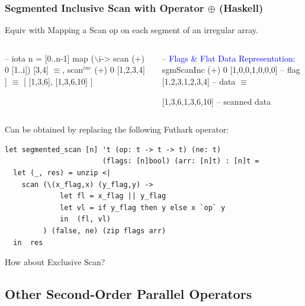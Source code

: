 \documentclass{beamer}
\newcommand{\blue}[1]{\textcolor{Blue}{{#1}}}
\renewcommand{\emph}[1]{\textcolor{structure}{#1}}
\newcommand{\emp}[1]{\textcolor{DikuRed}{ #1}}
\newcommand{\emphh}[1]{\textcolor{CosGreen}{ #1}}
\newcommand{\mymath}[1]{$ #1 $}
\newcommand{\myindu}[1]{^{#1}}
\begin{document}
\begin{frame}[fragile,t]
  \frametitle{Segmented Inclusive Scan with Operator $\oplus$ (Haskell)}

\emphh{Equiv with Mapping a Scan op on each segment of an irregular array.}

\begin{columns}
\begin{colorcode}
-- iota n = [0..n-1]
map (\mymath{\backslash}i-> scan (+) 0 [1..i]) [3,4] \emph{\mymath{\equiv}}\pause
[ scan\mymath{\myindu{inc}} (+) 0 [1,2,3], 
  scan\mymath{\myindu{inc}} (+) 0 [1,2,3,4] ] 
      \emph{\mymath{\equiv}}
[ [1,3,6], [1,3,6,10] ]
\end{colorcode}
\begin{colorcode}
-- \blue{Flags \& Flat Data Representation:}
sgmScanInc (+) 0 [1,0,0,1,0,0,0] -- \emph{flag}
                 [1,2,3,1,2,3,4] -- \emp{data}
    \emph{\mymath{\equiv}}

  [1,3,6,1,3,6,10]        -- \emp{scanned data}
\end{colorcode}
\end{columns}
\medskip



\emphh{Can be obtained by replacing the following Futhark operator:}
\smallskip

\begin{lstlisting}[mathescape=true]
let segmented_scan [n] 't (op: t -> t -> t) (ne: t)
                       (flags: [n]bool) (arr: [n]t) : [n]t =
  let (_, res) = unzip <|
    scan (\(x_flag,x) (y_flag,y) ->
             let fl = x_flag || y_flag
             let vl = if y_flag then y else x `op` y
             in  (fl, vl)
         ) (false, ne) (zip flags arr)
  in  res
\end{lstlisting}\vspace{-2ex}

\bigskip

\alert{How about Exclusive Scan?}

\end{frame}

\subsection{Other Second-Order Parallel Operators}

\begin{frame}[fragile]
	\tableofcontents[currentsubsection]
\end{frame}
\end{document}
